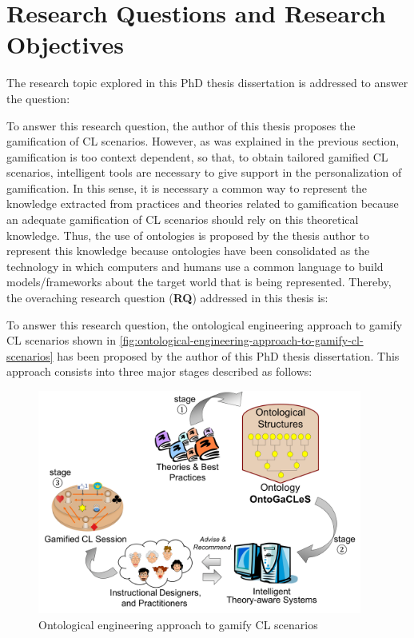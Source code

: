 \section{Research Questions and Research Objectives}
\label{sec:research-question-and-research-objectives}

The research topic explored in this PhD thesis dissertation is addressed to answer the question:

To answer this research question, the author of this thesis proposes the gamification of CL scenarios.
However, as was explained in the previous section, gamification is too context dependent, so that, to obtain tailored gamified CL scenarios, intelligent tools are necessary to give support in the personalization of gamification. 
In this sense, it is necessary a common way to represent the knowledge extracted from practices and theories related to gamification because an adequate gamification of CL scenarios should rely on this theoretical knowledge.
Thus, the use of ontologies is proposed by the thesis author to represent this knowledge because ontologies have been consolidated as the technology in which computers and humans use a common language to build models/frameworks about the target world that is being represented. 
Thereby, the overaching research question (\textbf{RQ}) addressed in this thesis is: 


To answer this research question, the ontological engineering approach to gamify CL scenarios shown in \autoref{fig:ontological-engineering-approach-to-gamify-cl-scenarios} has been proposed by the author of this PhD thesis dissertation. 
This approach consists into three major stages described as follows:

\begin{figure}[htb]
 \caption{Ontological engineering approach to gamify CL scenarios}
 \label{fig:ontological-engineering-approach-to-gamify-cl-scenarios}
 \centering
 \includegraphics[width=0.95\textwidth]{images/chap-introduction/ontological-engineering-approach-to-gamify-cl-scenarios.png}
 \fautor
\end{figure}

